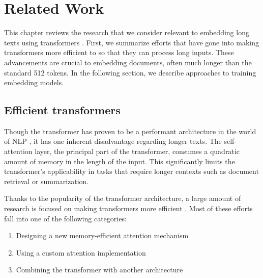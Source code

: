 \chapter{Related Work}

This chapter reviews the research that we consider relevant to embedding
long texts using transformers \citep{vaswani2017attention}. First, we summarize
efforts that have gone into making transformers more efficient to so that they
can process long inputs. These advancements are crucial to embedding documents,
often much longer than the standard 512 tokens. In the following section, we
describe approaches to training embedding models.

\section{Efficient transformers}\label{section:efficient_transformers}


Though the transformer has proven to be a performant architecture in the world
of NLP \citep{devlin2019bert, liu2019roberta, reimers2019sentence}, it has one
inherent disadvantage regarding longer texts. The self-attention layer, the
principal part of the transformer, consumes a quadratic amount of memory in the
length of the input. This significantly limits the transformer's applicability
in tasks that require longer contexts such as document retrieval or
summarization.

Thanks to the popularity of the transformer architecture, a large
amount of research is focused on making transformers more
efficient \citep{tay2022efficient}. Most of these efforts fall into one of the
following categories:

\begin{enumerate}

    \item Designing a new memory-efficient attention mechanism

    \item Using a custom attention implementation

    \item Combining the transformer with another architecture

\end{enumerate}

